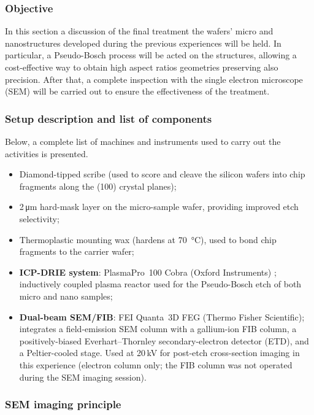 \label{sec:DRIE_mat_met}
\subsubsection{Objective}
In this section a discussion of the final treatment the wafers' micro
and nanostructures
developed during the previous experiences will be held. In particular,
a Pseudo-Bosch process will be acted on the structures, allowing a
cost-effective way to
obtain high aspect ratios geometries preserving also precision.
After that, a complete inspection with the single electron microscope
(SEM) will be carried out
to ensure the effectiveness of the treatment.

\subsubsection{Setup description and list of components}

Below, a complete list of machines and instruments used to carry out
the activities is presented.
\begin{itemize}
  \item Diamond-tipped scribe (used to score and cleave the silicon wafers
    into chip fragments along the (100) crystal planes);
  \item 2\,\si{\micro\meter}  hard-mask layer on the micro-sample
    wafer, providing improved etch selectivity;
  \item Thermoplastic mounting wax (hardens at \SI{70}{\degreeCelsius}),
    used to bond chip fragments to the carrier wafer;
  \item \textbf{ICP-DRIE system}: PlasmaPro~100 Cobra (Oxford Instruments) \cite{PlasmaProCobra}; inductively coupled plasma reactor used for the Pseudo-Bosch etch of both micro and nano samples;
  \item \textbf{Dual-beam SEM/FIB}: FEI Quanta~3D FEG \cite{QuantaFEG} (Thermo Fisher Scientific); integrates a field-emission SEM column with a gallium-ion FIB column, a positively-biased Everhart--Thornley secondary-electron detector (ETD), and a Peltier-cooled stage. Used at 20\,kV for post-etch cross-section imaging in this experience (electron column only; the FIB column was not operated during the SEM imaging session).
\end{itemize}

\subsubsection*{SEM imaging principle}

